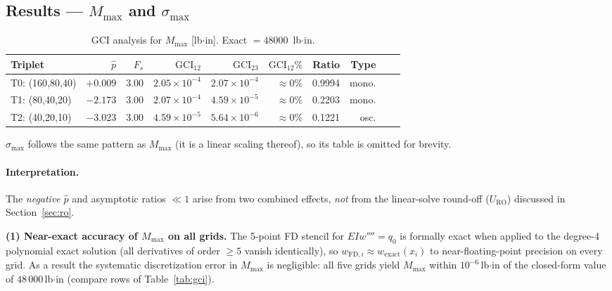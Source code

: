 \documentclass[11pt,letterpaper]{article}
\newcommand{\URO}{U_{\mathrm{RO}}}
\newcommand{\pobs}{\hat{p}}
\newcommand{\EI}{EI}
\newcommand{\GCI}{\mathrm{GCI}}
\begin{document}
\subsection{Results — \texorpdfstring{$M_{\max}$}{M\_max} and \texorpdfstring{$\sigma_{\max}$}{sigma\_max}}

\begin{table}[h!]
\centering
\caption{GCI analysis for $M_{\max}$ [lb$\cdot$in]. Exact $= 48000$~lb$\cdot$in.}
\label{tab:gci_m}
\small
\begin{tabular}{lrrrrrrrrr}
  \toprule
  Triplet & $\pobs$ & $F_s$ & $\GCI_{12}$ & $\GCI_{23}$ & $\GCI_{12}\%$ & Ratio & Type \\
  \midrule
  T0: (160,80,40) & $+0.009$ & 3.00 & $2.05\times10^{-4}$ & $2.07\times10^{-4}$ & $\approx0\%$ & 0.9994 & mono. \\
  T1: (80,40,20)  & $-2.173$ & 3.00 & $2.07\times10^{-4}$ & $4.59\times10^{-5}$ & $\approx0\%$ & 0.2203 & mono. \\
  T2: (40,20,10)  & $-3.023$ & 3.00 & $4.59\times10^{-5}$ & $5.64\times10^{-6}$ & $\approx0\%$ & 0.1221 & osc. \\
  \bottomrule
\end{tabular}
\end{table}

$\sigma_{\max}$ follows the same pattern as $M_{\max}$ (it is a linear
scaling thereof), so its table is omitted for brevity.

\paragraph{Interpretation.}
The \emph{negative} $\pobs$ and asymptotic ratios $\ll1$ arise from two
combined effects, \emph{not} from the linear-solve round-off ($\URO$)
discussed in Section~\ref{sec:ro}.

\textbf{(1) Near-exact accuracy of $M_{\max}$ on all grids.}
The 5-point FD stencil for $\EI w'''' = q_0$ is formally exact when applied
to the degree-4 polynomial exact solution (all derivatives of order $\ge 5$
vanish identically), so $w_{\mathrm{FD},i}\approx w_{\mathrm{exact}}(x_i)$
to near-floating-point precision on every grid.  As a result the systematic
discretization error in $M_{\max}$ is negligible: all five grids yield
$M_{\max}$ within $10^{-6}$\,lb$\cdot$in of the closed-form value of
$48\,000$\,lb$\cdot$in (compare rows of Table~\ref{tab:gci}).
\end{document}

